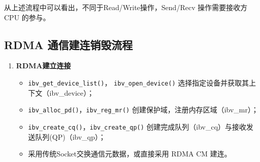 {\begin{enumerate}[label=\arabic*.]
              从上述流程中可以看出，不同于Read/Write操作，Send/Recv 操作需要接收方 CPU 的参与。
    \end{enumerate}


    \subsection{RDMA 通信建连销毁流程}



    \begin{enumerate}[label=\textbf{步骤 \arabic*.}, leftmargin=0.5cm, align=left]
        \item \textbf{RDMA建立连接}
              \begin{itemize}
                  \item \texttt{ibv\_get\_device\_list()}， \texttt{ibv\_open\_device()}
                        选择指定设备并获取其上下文（ibv\_device）；
                  \item \texttt{ibv\_alloc\_pd()}，\texttt{ibv\_reg\_mr()} 创建保护域，注册内存区域（ibv\_mr）；
                  \item \texttt{ibv\_create\_cq()}，\texttt{ibv\_create\_qp()} 创建完成队列（ibv\_cq）与接收发送队列(QP)（ibv\_qp）；
                  \item 采用传统Socket交换通信元数据，或直接采用 RDMA CM 建连。
              \end{itemize}


\end{enumerate}}
